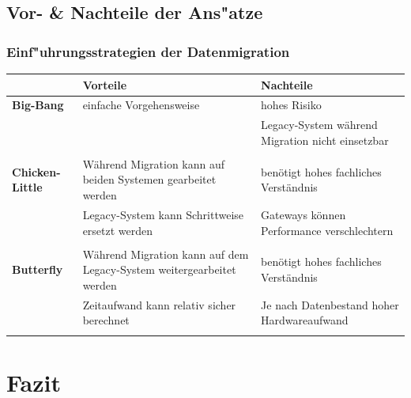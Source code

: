 \documentclass{beamer}
\begin{document}
	\subsection{Vor- \& Nachteile der Ans"atze}
	\begin{frame}
		\frametitle{Einf"uhrungsstrategien der Datenmigration}
		
                \begin{footnotesize}
                \begin{table}[h]
                \centering
                \begin{tabular}{|p{1.5cm}|p{4.25cm}|p{4.25cm}|}
               
                \hline
                & \textbf{Vorteile} & \textbf{Nachteile} \\ 
		\hline
		\textbf{Big-Bang} & einfache Vorgehensweise & hohes Risiko \\
		\cline{3-3}
		& & Legacy-System während Migration nicht einsetzbar \\
		& & \\
		\hline
		
		\textbf{Chicken-Little} & Während Migration kann auf beiden Systemen gearbeitet werden & benötigt hohes fachliches Verständnis \\
		\cline{2-3}
		& Legacy-System kann Schrittweise ersetzt werden & Gateways können Performance verschlechtern \\
		& & \\
		\hline
		
		\textbf{Butterfly} & Während Migration kann auf dem Legacy-System weitergearbeitet werden & benötigt hohes fachliches Verständnis \\
		\cline{2-3}
		& Zeitaufwand kann relativ sicher berechnet & Je nach Datenbestand hoher Hardwareaufwand \\
		& & \\
		\hline
		
		
		\end{tabular}
		\end{table}
		\end{footnotesize}
	
	\end{frame}
	
	
	\section{Fazit}
	
\end{document}
